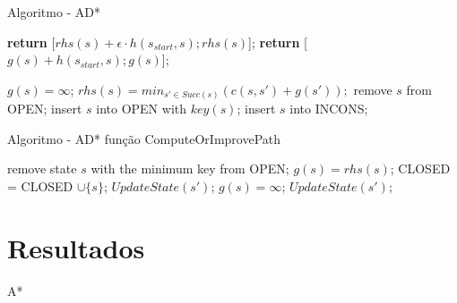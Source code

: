 \begin{frame}{Algoritmo - AD*}
\begin{algorithm}[H]
\caption{key(s)}
\begin{algorithmic}[1]
\State \textbf{return} [$rhs(s) + \epsilon \cdot h(s_{start}, s); rhs(s)$];
\Else
\State \textbf{return} [$g(s) + h(s_{start}, s); g(s)$];
\EndIf
\end{algorithmic}
\end{algorithm}
\begin{algorithm}[H]
\caption{UpdateState(s)}
\begin{algorithmic}[1]
    \State $g(s) = \infty$;
\EndIf
{} $rhs(s)=min_{s' \in Succ(s)}(c(s,s') + g(s'));$
\EndIf
{} remove $s$ from OPEN;
\EndIf
{} 
    \State insert $s$ into OPEN with $key(s)$;
    \Else
    \State insert $s$ into INCONS;
    \EndIf
\EndIf
\end{algorithmic}
\end{algorithm}
\end{frame}

\begin{frame}{Algoritmo - AD* função ComputeOrImprovePath}
\begin{algorithm}[H]
\caption{ComputeOrImprovePath()}
\begin{algorithmic}[1]
\State remove state $s$ with the minimum key from OPEN;
\State $g(s) = rhs(s)$;
\State CLOSED = CLOSED $\cup \{s\}$;
 $UpdateState(s')$;
\EndFor
\Else 
\State $g(s) = \infty$;
 $UpdateState(s')$;
\EndFor
\EndIf
\EndWhile
\end{algorithmic}
\end{algorithm}
\end{frame}

\section{Resultados}
\begin{frame}{A*}

\end{frame}
